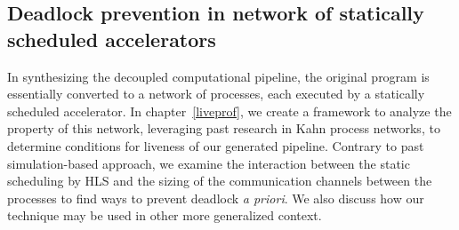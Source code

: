 \subsection{Deadlock prevention in network of statically scheduled accelerators}
In synthesizing the decoupled computational pipeline, the original program
is essentially converted to a network of processes, each executed by a statically scheduled accelerator. In chapter~\ref{liveprof}, we create a framework to analyze the property of this network, leveraging past research in Kahn process networks, to determine conditions for liveness of our generated pipeline. 
Contrary to past simulation-based approach, we examine the interaction between the static scheduling by HLS and the sizing of the communication channels between the processes to find ways to prevent deadlock \textit{a priori}. We also
discuss how our technique may be used in other more generalized context.

